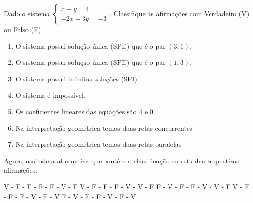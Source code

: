 Dado o sistema $\left\{ \begin{array}{l}
x+y=4\\
-2x+3y=-3
\end{array} \right.$. Classifique as afirmações com Verdadeiro (V) ou Falso (F).
\begin{enumerate}[(\quad)]
\item O sistema possui solução única (SPD) que é o par $(3,1)$.
\item O sistema possui solução única (SPD) que é o par $(1,3)$.
\item O sistema possui infinitas soluções (SPI).
\item O sistema é impossível.
\item Os coeficientes lineares das equações são $4$ e $0$.
\item Na interpretação geométrica temos duas retas concorrentes
\item Na interpretação geométrica temos duas retas paralelas
\end{enumerate}
Agora, assinale a alternativa que contém a classificação correta das respectivas afirmações.

V - F - F - F - F - V - F
V - F - F - F - V - V - F
F - V - F - F - V - V - F
V - F - F - F - V - F - V
F - V - F - F - V - F - V


